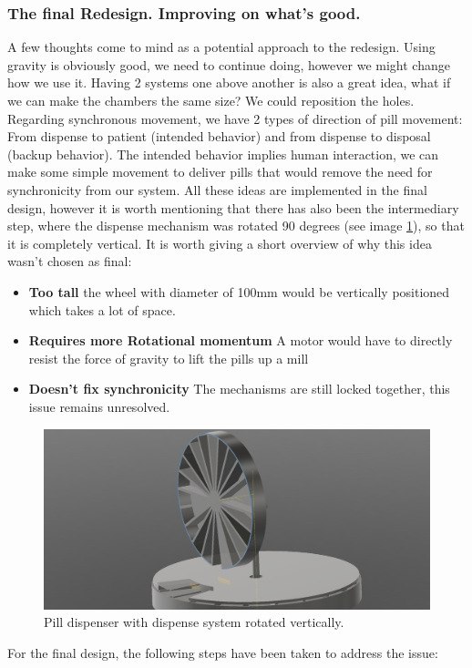 \subsubsection{The final Redesign. Improving on what's good.}
A few thoughts come to mind as a potential approach to the redesign. Using gravity is obviously good, we need to continue doing, however we might change how we use it. Having 2 systems one above another is also a great idea, what if we can make the chambers the same size? We could reposition the holes. Regarding synchronous movement, we have 2 types of direction of pill movement: From dispense to patient (intended behavior) and from dispense to disposal (backup behavior). The intended behavior implies human interaction, we can make some simple movement to deliver pills that would remove the need for synchronicity from our system. All these ideas are implemented in the final design, however it is worth mentioning that there has also been the intermediary step, where the dispense mechanism was rotated 90 degrees (see image \ref{fig:screenshot4}), so that it is completely vertical. It is worth giving a short overview of why this idea wasn't chosen as final:
\begin{itemize}
	\item{\textbf{Too tall}} the wheel with diameter of 100mm would be vertically positioned which takes a lot of space.
	\item{\textbf{Requires more Rotational momentum}} A motor would have to directly resist the force of gravity to lift the pills up a mill
	\item{\textbf{Doesn't fix synchronicity}} The mechanisms are still locked together, this issue remains unresolved.
\end{itemize}
\begin{figure}[]
	\centering
	\includegraphics[width=0.6\linewidth]{Figures/Screenshot_4}
	\caption[Vertical Pill Dispenser.]{Pill dispenser with dispense system rotated vertically.}
	\label{fig:screenshot4}
\end{figure}
\newpage
For the final design, the following steps have been taken to address the issue:
